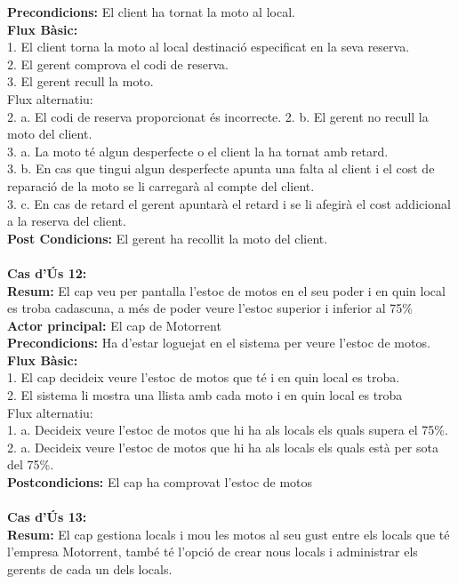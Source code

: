 \documentclass{article}
\begin{document}
\textbf{Precondicions:} El client ha tornat la moto al local.\\
\textbf{Flux B\`asic:}\\
1. El client torna la moto al local destinaci\'o especificat en la seva reserva.\\
2. El gerent comprova el codi de reserva.\\
3. El gerent recull la moto.\\
Flux alternatiu: \\
2. a. El codi de reserva proporcionat \'es incorrecte. 
2. b. El gerent no recull la moto del client.\\
3. a. La moto t\'e algun desperfecte o el client la ha tornat amb retard.\\
3. b. En cas que tingui algun desperfecte apunta una falta al client i el cost de reparaci\'o de la moto se li carregar\`a al compte del client.\\
3. c. En cas de retard el gerent apuntar\`a el retard i se li afegir\`a el cost addicional a la reserva del client.\\
\textbf{Post Condicions:} El gerent ha recollit la moto del client.\\\\
\textbf{Cas d'\'Us 12:}\\
\textbf{Resum:} El cap veu per pantalla l'estoc de motos en el seu poder i en quin local es troba cadascuna, a m\'es de poder veure l'estoc superior i inferior al 75\%\\
\textbf{Actor principal:} El cap de Motorrent\\
\textbf{Precondicions:} Ha d'estar loguejat en el sistema per veure l'estoc de motos.\\
\textbf{Flux B\`asic:}\\
1. El cap decideix veure l'estoc de motos que t\'e i en quin local es troba.\\
2. El sistema li mostra una llista amb cada moto i en quin local es troba\\
Flux alternatiu:\\
1. a. Decideix veure l'estoc de motos que hi ha als locals els quals supera el 75\%.\\
2. a. Decideix veure l'estoc de motos que hi ha als locals els quals està per sota del 75\%.\\
\textbf{Postcondicions:} El cap ha comprovat l'estoc de motos\\\\
\textbf{Cas d'\'Us 13:}\\
\textbf{Resum:} El cap gestiona locals i mou les motos al seu gust entre els locals que t\'e l'empresa Motorrent, tamb\'e t\'e l'opci\'o de crear nous locals i administrar els gerents de cada un dels locals.\\
\end{document}
